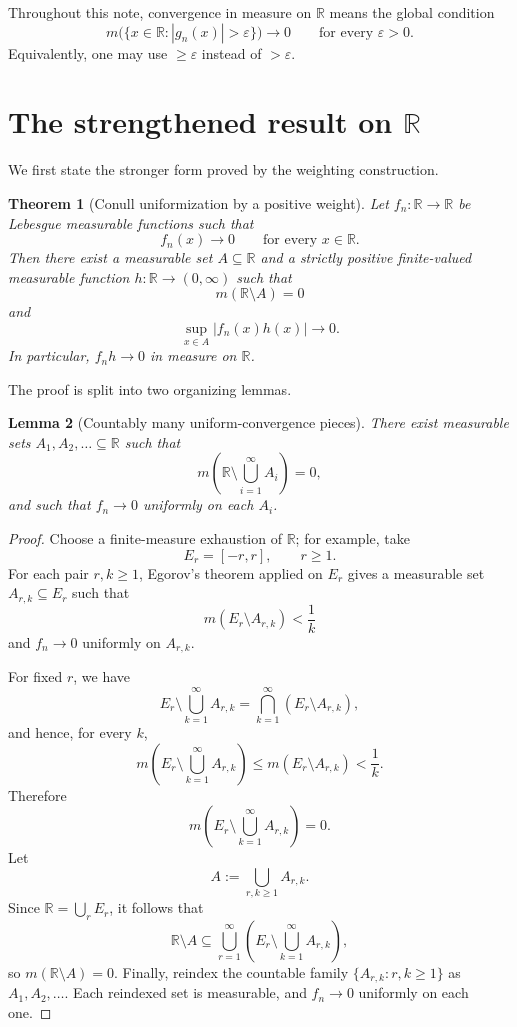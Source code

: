 \documentclass[11pt]{article}
\newcommand{\R}{\mathbb{R}}
\newcommand{\eps}{\varepsilon}
\theoremstyle{plain}
\newtheorem{theorem}{Theorem}[section]
\newtheorem{lemma}[theorem]{Lemma}
\theoremstyle{definition}
\theoremstyle{remark}
\begin{document}
Throughout this note, convergence in measure on $\R$ means the global
condition
\[
        m\bigl(\{x\in\R: |g_n(x)|>\eps\}\bigr)\longrightarrow 0
        \qquad\text{for every }\eps>0.
\]
Equivalently, one may use $\geq \eps$ instead of $>\eps$.

\section{The strengthened result on \texorpdfstring{$\R$}{R}}

We first state the stronger form proved by the weighting construction.

\begin{theorem}[Conull uniformization by a positive weight]\label{thm:main-R}
Let $f_n:\R\to\R$ be Lebesgue measurable functions such that
\[
        f_n(x)\to 0
        \qquad\text{for every }x\in\R.
\]
Then there exist a measurable set $A\subseteq\R$ and a strictly positive
finite-valued measurable function $h:\R\to(0,\infty)$ such that
\[
        m(\R\setminus A)=0
\]
and
\[
        \sup_{x\in A}|f_n(x)h(x)|\longrightarrow 0.
\]
In particular, $f_nh\to 0$ in measure on $\R$.
\end{theorem}

The proof is split into two organizing lemmas.

\begin{lemma}[Countably many uniform-convergence pieces]\label{lem:egorov-pieces}
There exist measurable sets $A_1,A_2,\dots\subseteq\R$ such that
\[
        m\left(\R\setminus \bigcup_{i=1}^\infty A_i\right)=0,
\]
and such that $f_n\to 0$ uniformly on each $A_i$.
\end{lemma}

\begin{proof}
Choose a finite-measure exhaustion of $\R$; for example, take
\[
        E_r=[-r,r],\qquad r\geq 1.
\]
For each pair $r,k\geq 1$, Egorov's theorem applied on $E_r$ gives a
measurable set $A_{r,k}\subseteq E_r$ such that
\[
        m(E_r\setminus A_{r,k})<\frac{1}{k}
\]
and $f_n\to 0$ uniformly on $A_{r,k}$.

For fixed $r$, we have
\[
        E_r\setminus \bigcup_{k=1}^\infty A_{r,k}
        =\bigcap_{k=1}^\infty (E_r\setminus A_{r,k}),
\]
and hence, for every $k$,
\[
        m\left(E_r\setminus \bigcup_{k=1}^\infty A_{r,k}\right)
        \leq m(E_r\setminus A_{r,k})<\frac{1}{k}.
\]
Therefore
\[
        m\left(E_r\setminus \bigcup_{k=1}^\infty A_{r,k}\right)=0.
\]
Let
\[
        A:=\bigcup_{r,k\geq 1}A_{r,k}.
\]
Since $\R=\bigcup_r E_r$, it follows that
\[
        \R\setminus A
        \subseteq
        \bigcup_{r=1}^\infty
        \left(E_r\setminus \bigcup_{k=1}^\infty A_{r,k}\right),
\]
so $m(\R\setminus A)=0$.  Finally, reindex the countable family
$\{A_{r,k}:r,k\geq 1\}$ as $A_1,A_2,\dots$.  Each reindexed set is measurable,
and $f_n\to 0$ uniformly on each one.
\end{proof}
\end{document}
